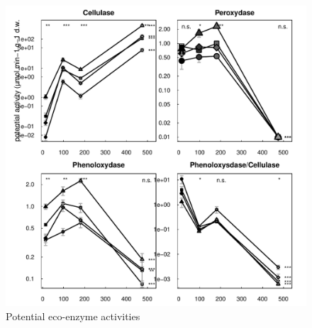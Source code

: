 \documentclass[10pt]{article}
\begin{document}
\newpage
\begin{figure}[h!]
\vspace*{2mm}
\begin{center}
\includegraphics{plosone-enz}
\end{center}
\caption{Potential eco-enzyme activities}
\label{fig:enz}
\end{figure}


\end{document}
